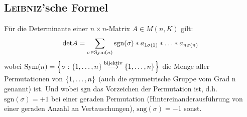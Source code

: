 \subsection{\textsc{Leibniz}'sche Formel}
\begin{satz}{}
	Für die Determinante einer $n\times n$-Matrix $A\in M(n,K)$ gilt:
	\begin{equation*}
		\mathrm{det} A=\sum_{\sigma\in \mathrm{Sym}(n)}\mathrm{sgn}(\sigma)*a_{1\sigma(1)}*\ldots*a_{n\sigma(n)}
	\end{equation*}
	wobei $\mathrm{Sym}(n)=
	\left\{ 
		\sigma:
		\left\{ 1,\ldots,n \right\}
			\overset{\text{bijektiv}}{\longrightarrow}
		\left\{ 1,\ldots,n \right\}
	 \right\}$ die Menge aller Permutationen von $\left\{ 1,\ldots,n \right\}$ (auch die symmetrische Gruppe vom Grad n genannt) ist. Und wobei $\mathrm{sgn}$ das Vorzeichen der Permutation ist, d.h. $\mathrm{sgn}(\sigma)=+1$ bei einer geraden Permutation (Hintereinanderausführung von einer geraden Anzahl an Vertauschungen), $\mathrm{sng}(\sigma)=-1$ sonst.
\end{satz}
